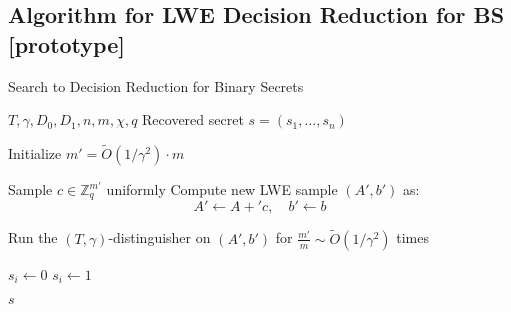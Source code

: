 \documentclass{article}
\begin{document}
    \subsection*{Algorithm for LWE Decision Reduction for BS [prototype]}
    \begin{algorithm}
        \caption{Search to Decision Reduction for Binary Secrets}
        \begin{algorithmic}[1]
            \Require \( T, \gamma, D_0, D_1, n, m, \chi, q \)
            \Ensure Recovered secret \( s = (s_1, \ldots, s_n) \)
            
            \State Initialize \( m' = \tilde{O}(1/\gamma^2) \cdot m \)
            
                \State Sample \( c \in \mathbb{Z}_q^{m'} \) uniformly
                \State Compute new LWE sample \( (A', b') \) as:
                \[
                A' \leftarrow A + 'c, \quad b' \leftarrow b
                \]
                
                \State Run the \((T, \gamma)\)-distinguisher on \( (A', b') \) for \( \frac{m'}{m} \sim \tilde{O}(1/\gamma^2) \) times
                
                    \State \( s_i \leftarrow 0 \)
                \Else
                    \State \( s_i \leftarrow 1 \)
                \EndIf
            \EndFor
            
            \State \Return \( s \)
        \end{algorithmic}
        \end{algorithm}
        
\end{document}
